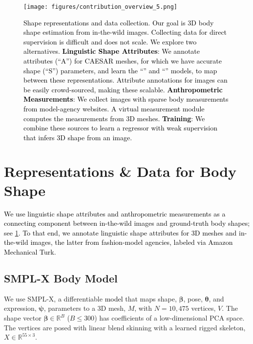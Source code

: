 \documentclass[10pt,twocolumn,letterpaper]{article}
\newcommand{\qheading}[1]{\noindent\textbf{#1}:}
\newcommand{\TODO}[1]{\xspace{\color{red} #1}\xspace}
\renewcommand{\TODO}[1]{\xspace{\color{black} #1}\xspace}
\newcommand{\AtoS}{\text{\mbox{A2S}}\xspace}
\newcommand{\StoA}{\text{\mbox{S2A}}\xspace}
\newcommand{\threeD}{3D\xspace}
\newcommand{\smplx}{\mbox{SMPL-X}\xspace}
\newcommand{\smplX}{\smplx}
\newcommand{\caesar}{\mbox{CAESAR}\xspace}
\newcommand{\inthewild}{\mbox{in-the-wild}\xspace}
\newcommand{\nvertices}{10,475\xspace}
\newcommand{\mesh}{M}
\newcommand{\shape}{\bm{\beta}}
\newcommand{\pose}{\bm{\theta}}
\newcommand{\expression}{\bm{\psi}}
\newcommand{\cameraready}[1]{\textcolor{Fuchsia}{{#1}}\xspace}
\renewcommand{\cameraready}[1]{\textcolor{black}{{#1}}\xspace}
\newcommand{\colorTERM}{blue}
\renewcommand{\colorTERM}{black}
\newcommand{\measurements}[0]{{\color{\colorTERM}anthropometric measurements}\xspace}
\newcommand{\Measurements}[0]{{\color{\colorTERM}Anthropometric Measurements}\xspace}
\newcommand{\linguisticshapeattributes}[0]{{\color{\colorTERM}linguistic shape attributes}\xspace}
\newcommand{\LinguisticShapeAttributes}[0]{{\color{\colorTERM}Linguistic Shape Attributes}\xspace}
\begin{document}
 \begin{figure}[!t]
    \centering
    \texttt{[image: figures/contribution\_overview\_5.png]}
    \caption{\cameraready{\TODO{Shape representations and data collection}. 
        Our goal is \threeD body shape estimation from \inthewild images. 
        Collecting data for direct supervision is difficult and does not scale.
        We explore two alternatives. \qheading{\LinguisticShapeAttributes} 
        We annotate attributes (``A'') for
        \caesar meshes, for which we have accurate shape (``S'') parameters, and learn the 
        ``\AtoS'' and ``\StoA'' models, to map between these representations.
        Attribute annotations for images can be easily crowd-sourced, making these scalable.
        \qheading{\Measurements} 
        We collect images with sparse body measurements
        from model-agency websites.
        A virtual measurement module \cite{pujades2019virtual}
        computes the measurements from \threeD meshes.
        \qheading{Training} We combine these sources to learn a regressor  with weak supervision
        that infers \threeD shape from an image.
        }
    }
    \label{fig:representation_overview}
\end{figure} 
\section{Representations \& Data for Body Shape}  \label{sec:shape_data_represent}

\cameraready{We use \linguisticshapeattributes and \measurements
as a connecting component 
between in-the-wild images and ground-truth body shapes;
see \cref{fig:representation_overview}. 
To that end, we annotate \linguisticshapeattributes for \threeD meshes and
in-the-wild
images, the latter from fashion-model agencies, labeled
via Amazon Mechanical Turk. }


\subsection{\smplX Body Model}   \label{sec:body_model} 
We use \smplx \cite{Pavlakos2019_smplifyx},
a differentiable \cameraready{model} that maps shape, $\shape$, pose, $\pose$,
and expression, $\expression$, parameters to a \threeD mesh, $\mesh$,
with $N=\nvertices$ vertices, $V$. The shape vector $\shape \in \mathbb{R}^{B}$ ($B\leq300$)
has coefficients of a low-dimensional PCA space. 
The vertices are posed with linear blend skinning with a learned rigged skeleton, $X \in \mathbb{R}^{55 \times 3}$. 
\end{document}
